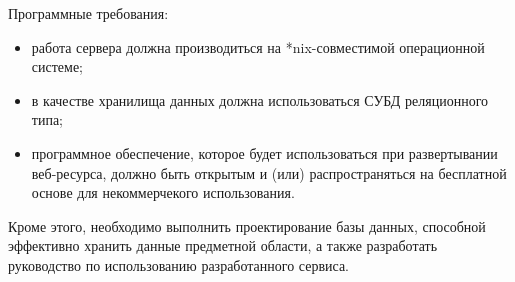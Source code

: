 Программные требования:
\begin{itemize}
\item работа сервера должна производиться на *nix-совместимой 
  операционной системе;
\item в качестве хранилища данных должна использоваться 
  СУБД реляционного типа;
\item программное обеспечение, которое будет использоваться при 
  развертывании веб-ресурса, должно быть открытым и (или) распространяться 
  на бесплатной основе для некоммерчекого использования. 
\end{itemize}

Кроме этого, необходимо выполнить проектирование базы данных, 
способной эффективно хранить данные предметной области, а также
разработать руководство по использованию разработанного сервиса.